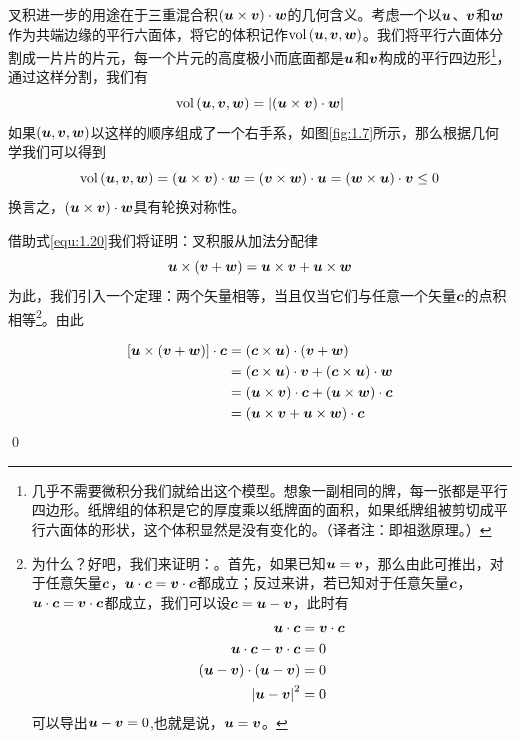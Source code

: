 叉积进一步的用途在于三重混合积$(\boldsymbol{u}\times \boldsymbol{v})\cdot \boldsymbol{w}$的几何含义。考虑一个以$\boldsymbol{u}$、$\boldsymbol{v}$和$\boldsymbol{w}$作为共端边缘的平行六面体，将它的体积记作$\mathrm{vol}\left( \boldsymbol{u},\boldsymbol{v},\boldsymbol{w} \right) $。我们将平行六面体分割成一片片的片元，每一个片元的高度极小而底面都是$\boldsymbol{u}$和$\boldsymbol{v}$构成的平行四边形\footnote{几乎不需要微积分我们就给出这个模型。想象一副相同的牌，每一张都是平行四边形。纸牌组的体积是它的厚度乘以纸牌面的面积，如果纸牌组被剪切成平行六面体的形状，这个体积显然是没有变化的。（译者注：即祖逖原理。）}，通过这样分割，我们有
\begin{equation}
    \mathrm{vol}\left( \boldsymbol{u},\boldsymbol{v},\boldsymbol{w} \right) =\left| \left( \boldsymbol{u}\times \boldsymbol{v} \right) \cdot \boldsymbol{w} \right|
\end{equation}
如果$(\boldsymbol{u},\boldsymbol{v},\boldsymbol{w})$以这样的顺序组成了一个右手系，如图\eqref{fig:1.7}所示，那么根据几何学我们可以得到
\begin{equation}\label{equ:1.20}
    \mathrm{vol}\left( \boldsymbol{u},\boldsymbol{v},\boldsymbol{w} \right) =\left( \boldsymbol{u}\times \boldsymbol{v} \right) \cdot \boldsymbol{w}=\left( \boldsymbol{v}\times \boldsymbol{w} \right) \cdot \boldsymbol{u}=\left( \boldsymbol{w}\times \boldsymbol{u} \right) \cdot \boldsymbol{v} \le 0
\end{equation}
换言之，$\left( \boldsymbol{u}\times \boldsymbol{v} \right) \cdot \boldsymbol{w}$具有轮换对称性。

借助式\eqref{equ:1.20}我们将证明：叉积服从加法分配律
\begin{equation}\label{equ:1.21}
    \boldsymbol{u}\times \left( \boldsymbol{v}+\boldsymbol{w} \right) =\boldsymbol{u}\times \boldsymbol{v}+\boldsymbol{u}\times \boldsymbol{w}
\end{equation}
为此，我们引入一个定理：两个矢量相等，当且仅当它们与任意一个矢量$\boldsymbol{c}$的点积相等\footnote{为什么？好吧，我们来证明：。首先，如果已知$\boldsymbol{u}=\boldsymbol{v}$，那么由此可推出，对于任意矢量$\boldsymbol{c}$，$\boldsymbol{u}\cdot \boldsymbol{c}=\boldsymbol{v}\cdot \boldsymbol{c}$都成立；反过来讲，若已知对于任意矢量$\boldsymbol{c}$，$\boldsymbol{u}\cdot \boldsymbol{c}=\boldsymbol{v}\cdot \boldsymbol{c}$都成立，我们可以设$\boldsymbol{c}=\boldsymbol{u}-\boldsymbol{v}$，此时有
\begin{align*}
	\boldsymbol{u}\cdot \boldsymbol{c}&=\boldsymbol{v}\cdot \boldsymbol{c}\\
	\boldsymbol{u}\cdot \boldsymbol{c}-\boldsymbol{v}\cdot \boldsymbol{c}&=0\\
	\left( \boldsymbol{u}-\boldsymbol{v} \right) \cdot \left( \boldsymbol{u}-\boldsymbol{v} \right) &=0\\
	\left| \boldsymbol{u}-\boldsymbol{v} \right|^2&=0
\end{align*}
可以导出$\boldsymbol{u}-\boldsymbol{v}=0$,也就是说，$\boldsymbol{u}=\boldsymbol{v}$。
}。由此

\begin{align*}
	\left[ \boldsymbol{u}\times \left( \boldsymbol{v}+\boldsymbol{w} \right) \right] \cdot \boldsymbol{c}&=\left( \boldsymbol{c}\times \boldsymbol{u} \right) \cdot \left( \boldsymbol{v}+\boldsymbol{w} \right)\\
	&=\left( \boldsymbol{c}\times \boldsymbol{u} \right) \cdot \boldsymbol{v}+\left( \boldsymbol{c}\times \boldsymbol{u} \right) \cdot \boldsymbol{w}\\
	&=\left( \boldsymbol{u}\times \boldsymbol{v} \right) \cdot \boldsymbol{c}+\left( \boldsymbol{u}\times \boldsymbol{w} \right) \cdot \boldsymbol{c}\\
	&=\left( \boldsymbol{u}\times \boldsymbol{v}+\boldsymbol{u}\times \boldsymbol{w} \right) \cdot \boldsymbol{c}
\end{align*}
\qed

